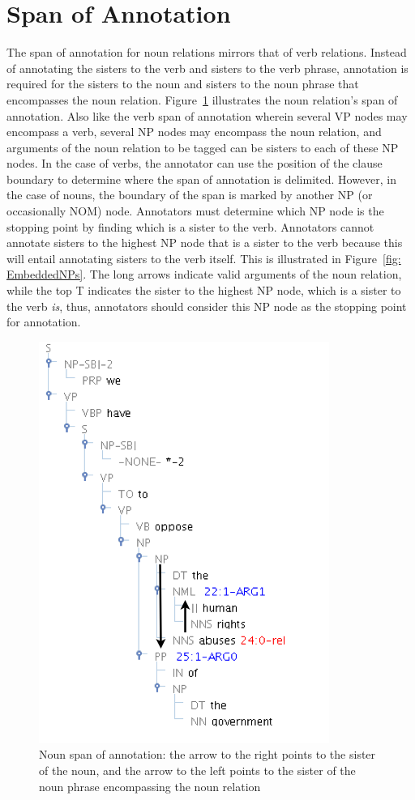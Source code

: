 \documentclass[11pt]{report}
\begin{document}
\section{Span of Annotation}
The span of annotation for noun relations mirrors that of verb relations.  Instead of annotating the sisters to the verb and sisters to the verb phrase, annotation is required for the sisters to the noun and sisters to the noun phrase that encompasses the noun relation.  Figure~\ref{fig: NounSpan} illustrates the noun relation's span of annotation.  Also like the verb span of annotation wherein several VP nodes may encompass a verb, several NP nodes may encompass the noun relation, and arguments of the noun relation to be tagged can be sisters to each of these NP nodes.  In the case of verbs, the annotator can use the position of the clause boundary to determine where the span of annotation is delimited.  However, in the case of nouns, the boundary of the span is marked by another NP (or occasionally NOM) node.  Annotators must determine which NP node is the stopping point by finding which is a sister to the verb.  Annotators cannot annotate sisters to the highest NP node that is a sister to the verb because this will entail annotating sisters to the verb itself.  This is illustrated in Figure~\ref{fig: EmbeddedNPs}. The long arrows indicate valid arguments of the noun relation, while the top T indicates the sister to the highest NP node, which is a sister to the verb \textit{is}, thus, annotators should consider this NP node as the stopping point for annotation.  

\begin{figure}[htbp]
\centering
\includegraphics[scale=0.5]{img/NounSpan.png}
\caption{Noun span of annotation: the arrow to the right points to the sister of the noun, and the arrow to the left points to the sister of the noun phrase encompassing the noun relation}
\label{fig: NounSpan}
\end{figure}
\end{document}
